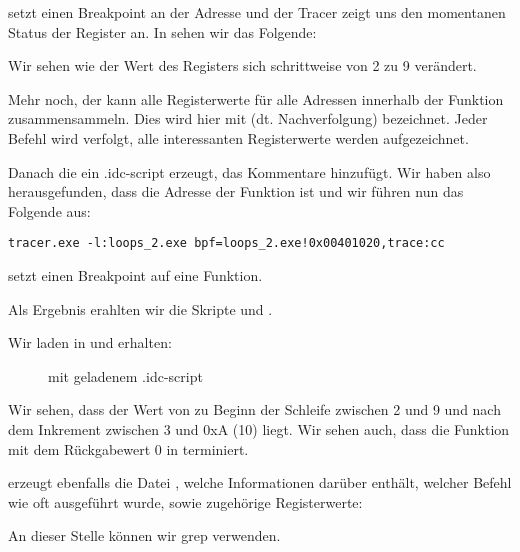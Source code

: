  setzt einen Breakpoint an der Adresse und der Tracer zeigt uns den
momentanen Status der Register an. In  sehen wir das Folgende:



Wir sehen wie der Wert des \ESI Registers sich schrittweise von 2 zu 9
verändert. 

Mehr noch, der \tracer kann alle Registerwerte für alle Adressen innerhalb der
Funktion zusammensammeln. Dies wird hier mit  (dt. Nachverfolgung)
bezeichnet. Jeder Befehl wird verfolgt, alle interessanten Registerwerte werden
aufgezeichnet.

Danach die ein \IDA .idc-script erzeugt, das Kommentare hinzufügt. Wir haben
also herausgefunden, dass die Adresse der \main Funktion  ist und
wir führen nun das Folgende aus:

\begin{lstlisting}
tracer.exe -l:loops_2.exe bpf=loops_2.exe!0x00401020,trace:cc
\end{lstlisting}

 setzt einen Breakpoint auf eine Funktion.

Als Ergebnis erahlten wir die Skripte  und
.

\clearpage
Wir laden  in \IDA und erhalten:

\begin{figure}[H]
\centering
{}
\caption{\IDA mit geladenem .idc-script}
\label{fig:loops_IDA_tracer}
\end{figure}

Wir sehen, dass der Wert von \ESI zu Beginn der Schleife zwischen 2 und 9 und
nach dem Inkrement zwischen 3 und 0xA (10) liegt. Wir sehen auch, dass die
Funktion \main mit dem Rückgabewert 0 in \EAX terminiert.

\tracer erzeugt ebenfalls die Datei , welche Informationen
darüber enthält, welcher Befehl wie oft ausgeführt wurde, sowie zugehörige
Registerwerte:


\myindex{\GrepUsage}
An dieser Stelle können wir grep verwenden.

